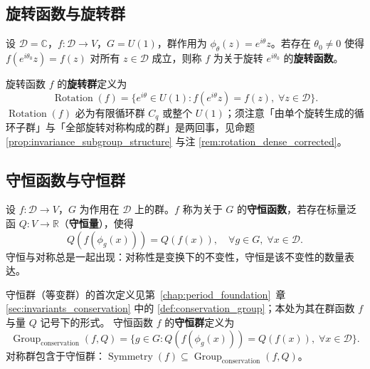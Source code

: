 \subsection{\texorpdfstring{旋转函数与旋转群}{旋转函数与旋转群}}

\begin{definition}[旋转函数]\label{def:rotation_function_gf}
设 $\mathcal{D} = \mathbb{C}$，$f: \mathcal{D} \to V$，$G = U(1)$，群作用为 $\phi_\theta(z) = e^{i\theta}z$。若存在 $\theta_0 \neq 0$ 使得 $f(e^{i\theta_0} z) = f(z)$ 对所有 $z \in \mathcal{D}$ 成立，则称 $f$ 为关于旋转 $e^{i\theta_0}$ 的\textbf{旋转函数}。
\end{definition}

\begin{definition}[旋转群]\label{def:rotation_group_gf}
旋转函数 $f$ 的\textbf{旋转群}定义为
\[
\operatorname{Rotation}(f) = \{e^{i\theta} \in U(1) : f(e^{i\theta}z) = f(z),\; \forall z \in \mathcal{D}\}.
\]
$\operatorname{Rotation}(f)$ 必为有限循环群 $C_q$ 或整个 $U(1)$；须注意「由单个旋转生成的循环子群」与「全部旋转对称构成的群」是两回事，见命题 \ref{prop:invariance_subgroup_structure} 与注 \ref{rem:rotation_dense_corrected}。
\end{definition}

\subsection{\texorpdfstring{守恒函数与守恒群}{守恒函数与守恒群}}

\begin{definition}[守恒函数]\label{def:conservation_function_gf}
设 $f: \mathcal{D} \to V$，$G$ 为作用在 $\mathcal{D}$ 上的群。$f$ 称为关于 $G$ 的\textbf{守恒函数}，若存在标量泛函 $Q: V \to \mathbb{R}$（\textbf{守恒量}），使得
\[
Q(f(\phi_g(x))) = Q(f(x)), \quad \forall g \in G,\; \forall x \in \mathcal{D}.
\]
守恒与对称总是一起出现：对称性是变换下的不变性，守恒是该不变性的数量表达。
\end{definition}

\begin{definition}[守恒群]\label{def:conservation_group_gf}
守恒群（等变群）的首次定义见第~\ref{chap:period_foundation}~章 \cref{sec:invariants_conservation} 中的 \cref{def:conservation_group}；本处为其在群函数 $f$ 与量 $Q$ 记号下的形式。
守恒函数 $f$ 的\textbf{守恒群}定义为
\[
\operatorname{Group}_{\mathrm{conservation}}(f, Q) = \{g \in G : Q(f(\phi_g(x))) = Q(f(x)),\; \forall x \in \mathcal{D}\}.
\]
对称群包含于守恒群：$\operatorname{Symmetry}(f) \subseteq \operatorname{Group}_{\mathrm{conservation}}(f, Q)$。
\end{definition}


